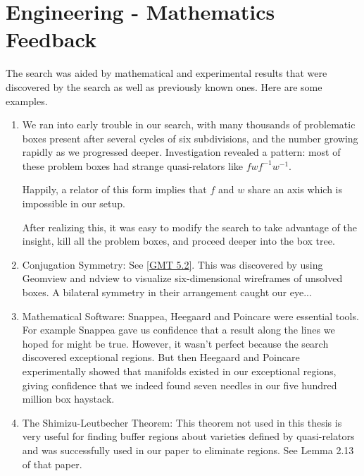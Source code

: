 \section{Engineering - Mathematics Feedback}
The search was aided
by mathematical and experimental results
that were discovered by the search
as well as previously known ones.
Here are some examples.
\begin{enumerate}
	\item 
		We ran into early trouble in our search, with many thousands
		of problematic boxes present after
		several cycles of six subdivisions, and the number growing
		rapidly as we progressed deeper.
		Investigation revealed a pattern:
		most of these problem boxes had strange quasi-relators
		like $fwf^{-1}w^{-1}$.
		
		Happily, a relator of this form
		implies that $f$ and $w$ share an axis
		which is impossible in our setup.

		After realizing this, it was easy to modify the search to
		take advantage of the insight,
		kill all the problem boxes,
		and proceed deeper into the box tree.
	\item Conjugation Symmetry: See \ref{GMT 5.2}.
		This was discovered by using Geomview and ndview
		to visualize six-dimensional wireframes of unsolved boxes.
		A bilateral symmetry in their arrangement caught our eye...
		
	\item Mathematical Software:
		Snappea, Heegaard and Poincare were essential tools.
		For example Snappea gave us confidence that a result along the lines we hoped for might be true.
		However, it wasn't perfect because the search discovered exceptional regions.
		But then Heegaard and Poincare experimentally showed
		that manifolds existed in our exceptional regions,
		giving confidence
		that we indeed found seven needles in
		our five hundred million box haystack.

	\item The Shimizu-Leutbecher Theorem:
		This theorem not used in this thesis is very useful
		for finding buffer regions about varieties
		defined by quasi-relators
		and was successfully used in our paper \cite{GHMTY}
		to eliminate regions. See Lemma 2.13 of that paper.

\end{enumerate}

